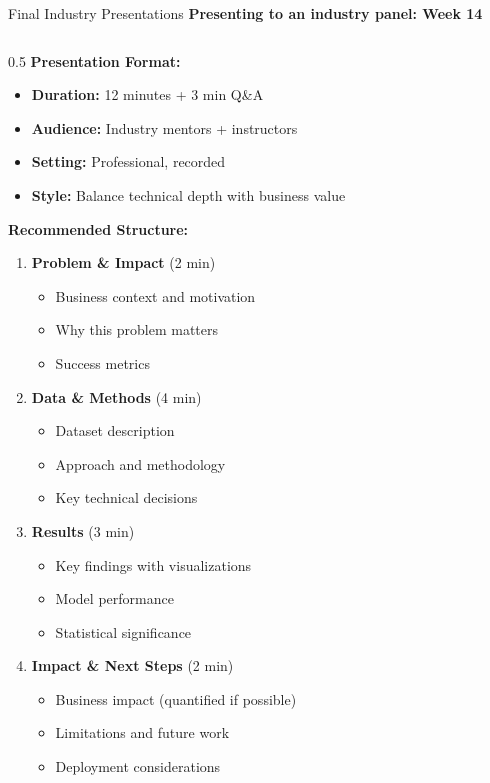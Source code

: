 \begin{frame}{Final Industry Presentations}
\textbf{Presenting to an industry panel: Week 14}

\begin{columns}
\begin{column}{0.5\textwidth}
\textbf{Presentation Format:}

\begin{itemize}
\item \textbf{Duration:} 12 minutes + 3 min Q\&A
\item \textbf{Audience:} Industry mentors + instructors
\item \textbf{Setting:} Professional, recorded
\item \textbf{Style:} Balance technical depth with business value
\end{itemize}

\vspace{0.3cm}

\textbf{Recommended Structure:}

\begin{enumerate}
\item \textbf{Problem \& Impact} (2 min)
   \begin{itemize}
   \item Business context and motivation
   \item Why this problem matters
   \item Success metrics
   \end{itemize}

\item \textbf{Data \& Methods} (4 min)
   \begin{itemize}
   \item Dataset description
   \item Approach and methodology
   \item Key technical decisions
   \end{itemize}

\item \textbf{Results} (3 min)
   \begin{itemize}
   \item Key findings with visualizations
   \item Model performance
   \item Statistical significance
   \end{itemize}

\item \textbf{Impact \& Next Steps} (2 min)
   \begin{itemize}
   \item Business impact (quantified if possible)
   \item Limitations and future work
   \item Deployment considerations
   \end{itemize}


\end{enumerate}
\end{column}
\end{columns}
\end{frame}
